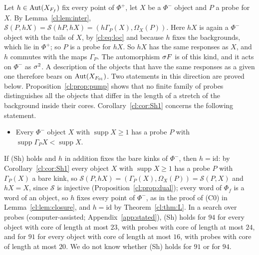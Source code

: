 \begin{remark}[responses]\label{cl:rem:IR}
Let $h\in\operatorname{Aut}(X_{F_f})$ fix every point of $\Phi^+$, let $X$ be a $\Phi^-$ object and $P$ a probe for $X$. By Lemma~\ref{cl:lem:inter}, $\mathcal S(P,hX)=\mathcal S(hP,hX)=(h\Gamma_P(X),\Omega_X(P))$. Here $hX$ is again a $\Phi^-$ object with the tails of $X$, by \eqref{cl:eq:loc} and because $h$ fixes the backgrounds, which lie in $\Phi^+$; so $P$ is a probe for $hX$. So $hX$ has the same responses as $X$, and $h$ commutes with the maps $\Gamma_P$. The automorphism $\sigma F$ is of this kind, and it acts on $\Phi^-$ as $\sigma^2$. A description of the objects that have the same responses as a given one therefore bears on $\operatorname{Aut}(X_{F_{91}})$. Two statements in this direction are proved below. Proposition~\ref{cl:prop:pump} shows that no finite family of probes distinguishes all the objects that differ in the length of a stretch of the background inside their cores. Corollary~\ref{cl:cor:Sh1} concerns the following statement.
\begin{itemize}
\item[(Sh)] Every $\Phi^-$ object $X$ with $\operatorname{supp}X\ge1$ has a probe $P$ with $\operatorname{supp}\Gamma_PX<\operatorname{supp}X$.
\end{itemize}
If (Sh) holds and $h$ in addition fixes the bare kinks of $\Phi^-$, then $h=\mathrm{id}$: by Corollary~\ref{cl:cor:Sh1} every object $X$ with $\operatorname{supp}X\ge1$ has a probe $P$ with $\Gamma_P(X)$ a bare kink, so $\mathcal S(P,hX)=(\Gamma_P(X),\Omega_X(P))=\mathcal S(P,X)$ and $hX=X$, since $\mathcal S$ is injective (Proposition~\ref{cl:prop:dual}); every word of $\Phi_f$ is a word of an object, so $h$ fixes every point of $\Phi^-$, as in the proof of (C0) in Lemma~\ref{cl:lem:closure}, and $h=\mathrm{id}$ by Theorem~\ref{cl:thm:L}. In a search over probes (computer-assisted; Appendix~\ref{app:stated}), (Sh) holds for $94$ for every object with core of length at most $23$, with probes with core of length at most $24$, and for $91$ for every object with core of length at most $16$, with probes with core of length at most $20$. We do not know whether (Sh) holds for $91$ or for $94$.
\end{remark}

